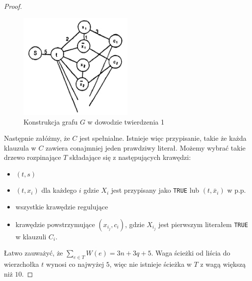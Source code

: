 \begin{theorem}
\begin{proof}
        \begin{figure}[h!]
            \centering
            \includegraphics[width=0.5\textwidth]{graph_proof.png}
            \caption{Konstrukcja grafu $G$ w dowodzie twierdzenia 1}
            \label{fig:graph_proof_construct}
        \end{figure}

        Następnie załóżmy, że $C$ jest spełnialne. Istnieje więc przypisanie, takie że każda klauzula w $C$ zawiera conajmniej jeden prawdziwy literał. Możemy wybrać takie drzewo rozpinające $T$ składające się z następujących krawędzi:
        \begin{itemize}
            \item $(t, s)$
            \item $(t, x_i)$ dla każdego $i$ gdzie $X_i$ jest przypisany jako \texttt{TRUE} lub $(t, \bar{x}_i)$ w p.p.
            \item wszystkie krawędzie regulujące
            \item krawędzie powstrzymujące $(x_{i_j}, c_i)$, gdzie $X_{i_j}$ jest pierwszym literałem \texttt{TRUE} w klauzuli $C_i$.
        \end{itemize}
        Łatwo zauważyć, że $\sum_{e\in T} W(e) = 3n + 3q + 5$. Waga ścieżki od liścia do wierzchołka $t$ wynosi co najwyżej $5$, więc nie istnieje ścieżka w $T$ z wagą większą niż $10$.


\end{proof}
\end{theorem}
